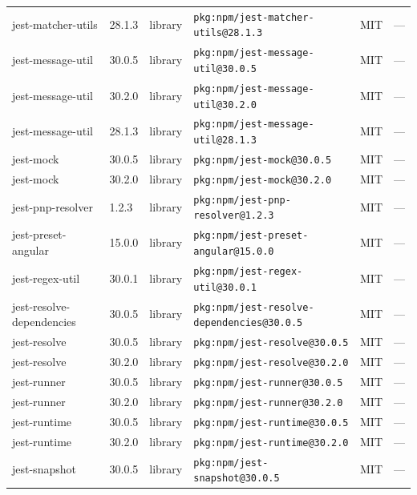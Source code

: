 \documentclass[11pt,a4paper]{article}
\begin{document}
\begin{longtable}{|p{4cm}|p{2cm}|p{1.6cm}|p{5cm}|p{1.5cm}|p{3.5cm}|}
\raggedright jest-matcher-utils & 28.1.3 & library & \small\texttt{pkg:npm/jest-matcher-utils@28.1.3} & MIT & \small — \\
\raggedright jest-message-util & 30.0.5 & library & \small\texttt{pkg:npm/jest-message-util@30.0.5} & MIT & \small — \\
\raggedright jest-message-util & 30.2.0 & library & \small\texttt{pkg:npm/jest-message-util@30.2.0} & MIT & \small — \\
\raggedright jest-message-util & 28.1.3 & library & \small\texttt{pkg:npm/jest-message-util@28.1.3} & MIT & \small — \\
\raggedright jest-mock & 30.0.5 & library & \small\texttt{pkg:npm/jest-mock@30.0.5} & MIT & \small — \\
\raggedright jest-mock & 30.2.0 & library & \small\texttt{pkg:npm/jest-mock@30.2.0} & MIT & \small — \\
\raggedright jest-pnp-resolver & 1.2.3 & library & \small\texttt{pkg:npm/jest-pnp-resolver@1.2.3} & MIT & \small — \\
\raggedright jest-preset-angular & 15.0.0 & library & \small\texttt{pkg:npm/jest-preset-angular@15.0.0} & MIT & \small — \\
\raggedright jest-regex-util & 30.0.1 & library & \small\texttt{pkg:npm/jest-regex-util@30.0.1} & MIT & \small — \\
\raggedright jest-resolve-dependencies & 30.0.5 & library & \small\texttt{pkg:npm/jest-resolve-dependencies@30.0.5} & MIT & \small — \\
\raggedright jest-resolve & 30.0.5 & library & \small\texttt{pkg:npm/jest-resolve@30.0.5} & MIT & \small — \\
\raggedright jest-resolve & 30.2.0 & library & \small\texttt{pkg:npm/jest-resolve@30.2.0} & MIT & \small — \\
\raggedright jest-runner & 30.0.5 & library & \small\texttt{pkg:npm/jest-runner@30.0.5} & MIT & \small — \\
\raggedright jest-runner & 30.2.0 & library & \small\texttt{pkg:npm/jest-runner@30.2.0} & MIT & \small — \\
\raggedright jest-runtime & 30.0.5 & library & \small\texttt{pkg:npm/jest-runtime@30.0.5} & MIT & \small — \\
\raggedright jest-runtime & 30.2.0 & library & \small\texttt{pkg:npm/jest-runtime@30.2.0} & MIT & \small — \\
\raggedright jest-snapshot & 30.0.5 & library & \small\texttt{pkg:npm/jest-snapshot@30.0.5} & MIT & \small — \\

\end{longtable}
\end{document}
